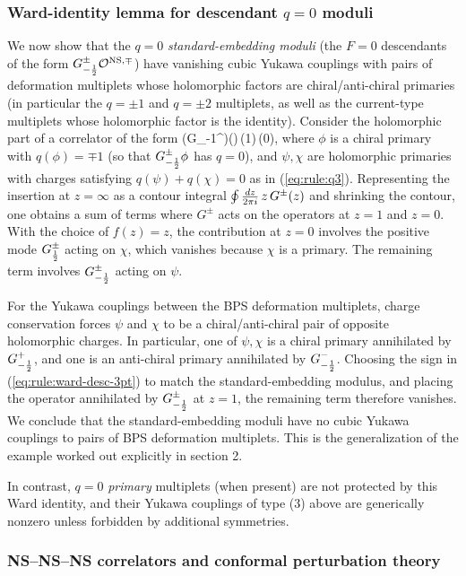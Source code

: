 \documentclass[12pt]{article}
\begin{document}
\subsubsection*{Ward-identity lemma for descendant $q=0$ moduli}

We now show that the $q=0$ \emph{standard-embedding moduli} (the $F=0$ descendants of the form $G_{-{1\over 2}}^\pm{\cal O}^{{\rm NS},\mp}$) have vanishing cubic Yukawa couplings with pairs of deformation multiplets whose holomorphic factors are chiral/anti-chiral primaries (in particular the $q=\pm 1$ and $q=\pm 2$ multiplets, as well as the current-type multiplets whose holomorphic factor is the identity). Consider the holomorphic part of a correlator of the form
\ie\label{eq:rule:ward-desc-3pt}
\left\langle \big(G_{-{1}}^\pm \phi\big)(\infty)\,\psi(1)\,\chi(0)\right\rangle,
\fe
where $\phi$ is a chiral primary with $q(\phi)=\mp 1$ (so that $G^\pm_{-{1\over 2}}\phi$ has $q=0$), and $\psi,\chi$ are holomorphic primaries with charges satisfying $q(\psi)+q(\chi)=0$ as in (\ref{eq:rule:q3}). Representing the insertion at $z=\infty$ as a contour integral $\oint {dz\over 2\pi i}\,z\,G^\pm(z)$ and shrinking the contour, one obtains a sum of terms where $G^\pm$ acts on the operators at $z=1$ and $z=0$. With the choice of $f(z)=z$, the contribution at $z=0$ involves the positive mode $G^\pm_{1\over 2}$ acting on $\chi$, which vanishes because $\chi$ is a primary. The remaining term involves $G^\pm_{-{1\over 2}}$ acting on $\psi$.

For the Yukawa couplings between the BPS deformation multiplets, charge conservation forces $\psi$ and $\chi$ to be a chiral/anti-chiral pair of opposite holomorphic charges. In particular, one of $\psi,\chi$ is a chiral primary annihilated by $G^+_{-{1\over 2}}$, and one is an anti-chiral primary annihilated by $G^-_{-{1\over 2}}$. Choosing the sign in (\ref{eq:rule:ward-desc-3pt}) to match the standard-embedding modulus, and placing the operator annihilated by $G^\pm_{-{1\over 2}}$ at $z=1$, the remaining term therefore vanishes. We conclude that the standard-embedding moduli have no cubic Yukawa couplings to pairs of BPS deformation multiplets. This is the generalization of the example worked out explicitly in section 2.

In contrast, $q=0$ \emph{primary} multiplets (when present) are not protected by this Ward identity, and their Yukawa couplings of type (3) above are generically nonzero unless forbidden by additional symmetries.

\subsubsection*{NS--NS--NS correlators and conformal perturbation theory}
\end{document}

